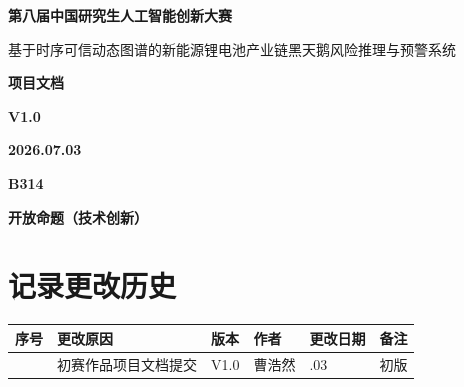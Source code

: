 \documentclass[12pt,a4paper]{article}
\begin{document}
\begin{titlepage}
    \thispagestyle{empty}
    \centering
    \vspace*{0.2cm}
    {\Huge\bfseries 第八届中国研究生人工智能创新大赛\par}
    \vspace*{8.0cm}
    {\Large\bfseries
    \begin{minipage}{0.86\textwidth}
        \centering
        基于时序可信动态图谱的新能源锂电池产业链黑天鹅风险推理与预警系统
    \end{minipage}\par}
    \vspace{1.2cm}
    {\Large\bfseries 项目文档\par}
    \vspace{0.4cm}
    {\large\bfseries V1.0\par}
    \vspace{2.3cm}
    {\large\bfseries 2026.07.03\par}
    \vspace{0.35cm}
    {\large\bfseries B314\par}
    \vspace{0.35cm}
    {\large\bfseries 开放命题（技术创新）\par}
    \vfill
\end{titlepage}

\tableofcontents
\clearpage

\section*{\centering 记录更改历史}

\begin{center}
\begin{tabular}{|>{\centering\arraybackslash}p{1.2cm}
                |>{\centering\arraybackslash}p{3.2cm}
                |>{\centering\arraybackslash}p{1.8cm}
                |>{\centering\arraybackslash}p{2.0cm}
                |>{\centering\arraybackslash}p{2.4cm}
                |>{\centering\arraybackslash}p{2.4cm}|}
    \hline
    序号 & 更改原因 & 版本 & 作者 & 更改日期 & 备注 \\
    \hline
    1 & 初赛作品项目文档提交 & V1.0 & 曹浩然 & 2026.07.03 & 初版 \\
    \hline
\end{tabular}
\end{center}
\clearpage
\end{document}
